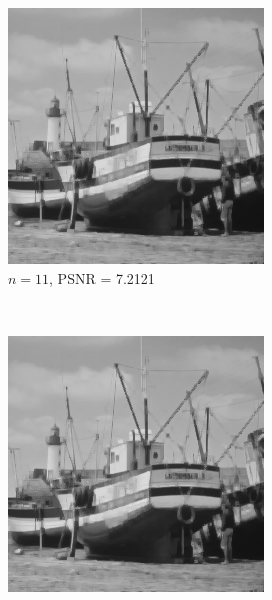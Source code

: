 \documentclass{article}
\begin{document}
\begin{enumerate}[label=(\alph*)]
\begin{figure}[!htb]
        \begin{subfigure}[b]{0.3\textwidth}
            \includegraphics[width=\textwidth]{img/RSC11.png}
            \caption{$n = 11$, PSNR = 7.2121}
        \end{subfigure}
        ~
        \begin{subfigure}[b]{0.3\textwidth}
            \includegraphics[width=\textwidth]{img/RSC13.png}

\end{subfigure}
\end{figure}
\end{enumerate}
\end{document}
